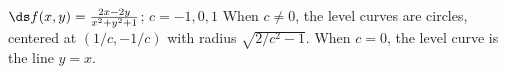 {$\ds f(x,y) = \frac{2x-2y}{x^2+y^2+1}$; $c = -1,0,1$}
{When $c\neq 0$, the level curves are circles, centered at $(1/c,-1/c)$ with radius $\sqrt{2/c^2-1}$. When $c=0$, the level curve is the line $y=x$.\\
}